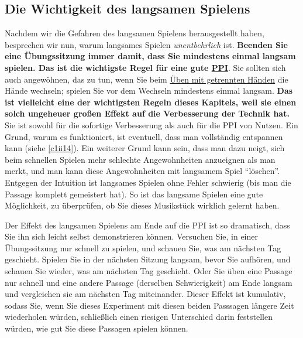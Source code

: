\label{c1ii17}


\subsection{Die Wichtigkeit des langsamen Spielens}

Nachdem wir die Gefahren des langsamen Spielens herausgestellt haben, besprechen wir nun, warum langsames Spielen \textit{unentbehrlich} ist.
\textbf{Beenden Sie eine Übungssitzung immer damit, dass Sie mindestens einmal langsam spielen.
Das ist die wichtigste Regel für eine gute \hyperref[c1ii15]{PPI}}.
Sie sollten sich auch angewöhnen, das zu tun, wenn Sie beim \hyperref[c1ii7]{Üben mit getrennten Händen} die Hände wechseln; spielen Sie vor dem Wechseln mindestens einmal langsam.
\textbf{Das ist vielleicht eine der wichtigsten Regeln dieses Kapitels, weil sie einen solch ungeheuer großen Effekt auf die Verbesserung der Technik hat.}
Sie ist sowohl für die sofortige Verbesserung als auch für die PPI von Nutzen.
Ein Grund, warum es funktioniert, ist eventuell, dass man vollständig entspannen kann (siehe \hyperref[c1ii14]{\autoref{c1ii14}}).
Ein weiterer Grund kann sein, dass man dazu neigt, sich beim schnellen Spielen mehr schlechte Angewohnheiten anzueignen als man merkt, und man kann diese Angewohnheiten mit langsamem Spiel \enquote{löschen}.
Entgegen der Intuition ist langsames Spielen ohne Fehler schwierig (bis man die Passage komplett gemeistert hat).
So ist das langsame Spielen eine gute Möglichkeit, zu überprüfen, ob Sie dieses Musikstück wirklich gelernt haben.

Der Effekt des langsamen Spielens am Ende auf die PPI ist so dramatisch, dass Sie ihn sich leicht selbst demonstrieren können.
Versuchen Sie, in einer Übungssitzung nur schnell zu spielen, und schauen Sie, was am nächsten Tag geschieht.
Spielen Sie in der nächsten Sitzung langsam, bevor Sie aufhören, und schauen Sie wieder, was am nächsten Tag geschieht.
Oder Sie üben eine Passage nur schnell und eine andere Passage (derselben Schwierigkeit) am Ende langsam und vergleichen sie am nächsten Tag miteinander.
Dieser Effekt ist kumulativ, sodass Sie, wenn Sie dieses Experiment mit diesen beiden Passsagen längere Zeit wiederholen würden, schließlich einen riesigen Unterschied darin feststellen würden, wie gut Sie diese Passagen spielen können.

